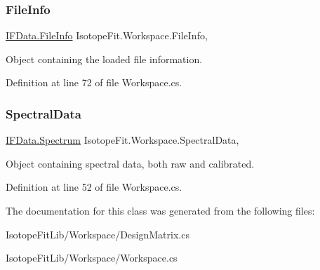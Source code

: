\subsubsection{\texorpdfstring{File\+Info}{FileInfo}}
{\footnotesize\ttfamily \hyperlink{class_isotope_fit_1_1_i_f_data_1_1_file_info}{I\+F\+Data.\+File\+Info} Isotope\+Fit.\+Workspace.\+File\+Info\hspace{0.3cm}{\ttfamily [get]}, {\ttfamily [set]}}



Object containing the loaded file information. 



Definition at line 72 of file Workspace.\+cs.

\mbox{\label{class_isotope_fit_1_1_workspace_a1d6cc2dd07cbfe920da9f1bffc9b32c2}} 
\subsubsection{\texorpdfstring{Spectral\+Data}{SpectralData}}
{\footnotesize\ttfamily \hyperlink{class_isotope_fit_1_1_i_f_data_1_1_spectrum}{I\+F\+Data.\+Spectrum} Isotope\+Fit.\+Workspace.\+Spectral\+Data\hspace{0.3cm}{\ttfamily [get]}, {\ttfamily [set]}}



Object containing spectral data, both raw and calibrated. 



Definition at line 52 of file Workspace.\+cs.



The documentation for this class was generated from the following files\+:\begin{DoxyCompactItemize}
\item 
Isotope\+Fit\+Lib/\+Workspace/Design\+Matrix.\+cs\item 
Isotope\+Fit\+Lib/\+Workspace/Workspace.\+cs\end{DoxyCompactItemize}
